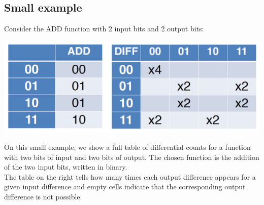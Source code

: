 	\subsection{Small example}
		Consider the ADD function with 2 input bits and 2 output bits:
		\begin{center}
			\includegraphics[width=140mm]{Graphics/Cryptanalysis/c5.png}
		\end{center}
		On this small example, we show a full table of differential counts for a function with two bits of input and two bits of output. 
		The chosen function is the addition of the two input bits, written in binary.\\
		The table on the right tells how many times each output difference appears for a given input difference and empty cells indicate that the corresponding output difference is not possible.
		
